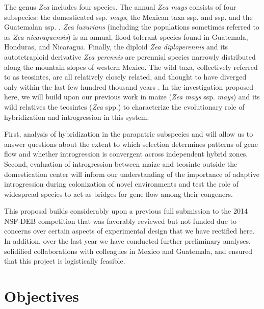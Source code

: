 The genus \emph{Zea} includes four species. The annual \emph{Zea mays} consists of four subspecies: the domesticated ssp. \emph{mays}, the Mexican taxa ssp. \zp{} and ssp. \zm{} and the Guatemalan ssp. \zh. \emph{Zea luxurians} (including the populations sometimes referred to as \emph{Zea nicaraguensis}) is an annual, flood-tolerant species found in Guatemala, Honduras, and Nicaragua. 
Finally, the diploid \emph{Zea diploperennis} and its autotetraploid derivative \emph{Zea perennis} are perennial species narrowly distributed along the mountain slopes of western Mexico. 
The wild taxa, collectively referred to as teosintes, are all relatively closely related, and thought to have diverged only within the last few hundred thousand years \citep{Ross-Ibarra2009a}. 
In the investigation proposed here, we will build upon our previous work in maize (\emph{Zea mays} ssp. \emph{mays}) and its wild relatives the teosintes (\emph{Zea} spp.) to characterize the evolutionary role of hybridization and introgression in this system. 

First, analysis of hybridization in the parapatric subspecies \zp{} and \zm{} will allow us to answer questions about the extent to which selection determines patterns of gene flow and whether introgression is convergent across independent hybrid zones.
Second, evaluation of introgression between maize and teosinte outside the domestication center will inform our understanding of the importance of adaptive introgression during colonization of novel environments and test the role of widespread species to act as bridges for gene flow among their congeners.

This proposal builds considerably upon a previous full submission to the 2014 NSF-DEB competition that was favorably reviewed but not funded due to concerns over certain aspects of experimental design that we have rectified here.
In addition, over the last year we have conducted further preliminary analyses, solidified collaborations with colleagues in Mexico and Guatemala, and ensured that this project is logistically feasible.

\section*{Objectives}
